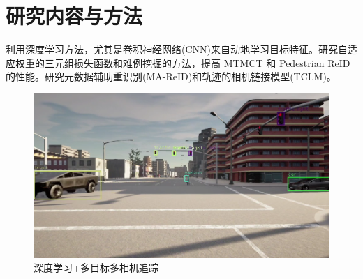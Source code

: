 \section{研究内容与方法}

利用深度学习方法，尤其是卷积神经网络(CNN)来自动地学习目标特征。研究自适应权重的三元组损失函数和难例挖掘的方法，提高 MTMCT 和 Pedestrian ReID 的性能。研究元数据辅助重识别(MA-ReID)和轨迹的相机链接模型(TCLM)。

\begin{figure}[htbp] %
	\centering
	\includegraphics[width=1.0\textwidth]{p37} %
	\caption{深度学习+多目标多相机追踪} %
	\label{fig:p37} %
\end{figure}

